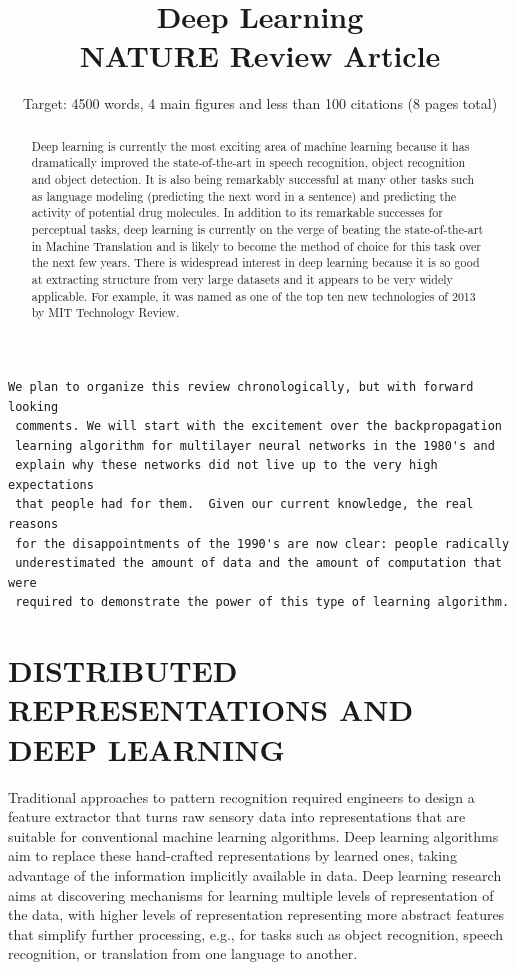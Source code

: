 \documentclass{article} %
\title{Deep Learning \\ NATURE Review Article}
\author{Target: 4500 words, 4 main figures and less than 100 citations (8 pages total)}
\begin{document}

\begin{abstract}
Deep learning is currently the most exciting area of machine learning
because it has dramatically improved the state-of-the-art in speech
recognition, object recognition and object detection.  It is also being
remarkably successful at many other tasks such as language modeling
(predicting the next word in a sentence) and predicting the activity of
potential drug molecules.  In addition to its remarkable successes for
perceptual tasks, deep learning is currently on the verge of beating the
state-of-the-art in Machine Translation and is likely to become the method
of choice for this task over the next few years.
There is widespread interest in deep learning because it is so good at
extracting structure from very large datasets and it appears to be very
widely applicable. For example, it was named as one of the top ten new
technologies of 2013 by MIT Technology Review.
\end{abstract}

\begin{verbatim}
We plan to organize this review chronologically, but with forward looking
 comments. We will start with the excitement over the backpropagation
 learning algorithm for multilayer neural networks in the 1980's and
 explain why these networks did not live up to the very high expectations
 that people had for them.  Given our current knowledge, the real reasons
 for the disappointments of the 1990's are now clear: people radically
 underestimated the amount of data and the amount of computation that were
 required to demonstrate the power of this type of learning algorithm.
\end{verbatim}

\section{DISTRIBUTED REPRESENTATIONS AND DEEP LEARNING}

Traditional approaches to pattern recognition required engineers to design
a feature extractor that turns raw sensory data into representations that
are suitable for conventional machine learning algorithms. Deep learning
algorithms aim to replace these hand-crafted representations by learned
ones, taking advantage of the information implicitly available in
data. Deep learning research aims at discovering mechanisms for learning
multiple levels of representation of the data, with higher levels of
representation representing more abstract features that simplify further
processing, e.g., for tasks such as object recognition, speech recognition,
or translation from one language to another.
\end{document}
